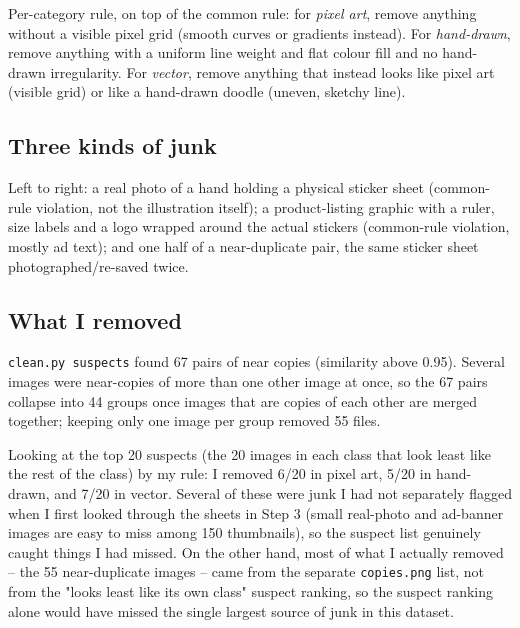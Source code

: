 \documentclass[11pt]{article}
\begin{document}
Per-category rule, on top of the common rule: for \emph{pixel art}, remove
anything without a visible pixel grid (smooth curves or gradients instead).
For \emph{hand-drawn}, remove anything with a uniform line weight and flat
colour fill and no hand-drawn irregularity. For \emph{vector}, remove
anything that instead looks like pixel art (visible grid) or like a hand-drawn
doodle (uneven, sketchy line).

\subsection*{Three kinds of junk}

\begin{center}
\hfill
{}\hfill
{}
\end{center}

Left to right: a real photo of a hand holding a physical sticker sheet
(common-rule violation, not the illustration itself); a product-listing
graphic with a ruler, size labels and a logo wrapped around the actual
stickers (common-rule violation, mostly ad text); and one half of a
near-duplicate pair, the same sticker sheet photographed/re-saved twice.

\subsection*{What I removed}

\texttt{clean.py suspects} found 67 pairs of near copies (similarity above
0.95). Several images were near-copies of more than one other image at once,
so the 67 pairs collapse into 44 groups once images that are copies of each
other are merged together; keeping only one image per group removed 55
files.

Looking at the top 20 suspects (the 20 images in each class that look least
like the rest of the class) by my rule: I removed 6/20 in pixel art, 5/20 in
hand-drawn, and 7/20 in vector. Several of these were junk I had not
separately flagged when I first looked through the sheets in Step 3 (small
real-photo and ad-banner images are easy to miss among 150 thumbnails), so
the suspect list genuinely caught things I had missed. On the other hand,
most of what I actually removed -- the 55 near-duplicate images -- came from
the separate \texttt{copies.png} list, not from the "looks least like its own
class" suspect ranking, so the suspect ranking alone would have missed the
single largest source of junk in this dataset.
\end{document}
